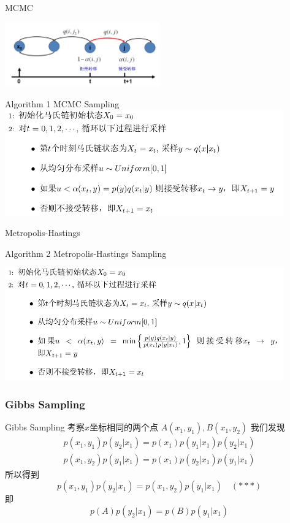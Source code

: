 \documentclass{beamer}
\begin{document}
\begin{CJK*}{UTF8}{gbsn}
\begin{frame}{MCMC}
\begin{center}
      \includegraphics[width=0.5\textwidth]{picture/MCMCp.png}
	\begin{block}{Algorithm 1 MCMC Sampling}
	\includegraphics[width=0.9\textwidth]{picture/MCMC.png}
	\end{block}
\end{center}
\end{frame}


\begin{frame}{Metropolis-Hastings}
\begin{center}
	\begin{block}{Algorithm 2 Metropolis-Hastings Sampling}
	\begin{center}
      \includegraphics[width=0.9\textwidth]{picture/MH.png}
    \end{center} 
	\end{block}
\end{center}
\end{frame}

\subsubsection{Gibbs Sampling}
\begin{frame}{Gibbs Sampling}
考察$x$坐标相同的两个点
$A(x_1,y_1), B(x_1,y_2)$
我们发现
\begin{align*}
p(x_1,y_1)p(y_2|x_1) = p(x_1)p(y_1|x_1)p(y_2|x_1) \\
p(x_1,y_2)p(y_1|x_1) = p(x_1)p(y_2|x_1)p(y_1|x_1)
\end{align*}
所以得到
\begin{equation}
\label{gibbs-detailed-balance}
p(x_1,y_1)p(y_2|x_1) = p(x_1,y_2)p(y_1|x_1)  \quad (***)
\end{equation}
即$$ p(A)p(y_2|x_1) = p(B)p(y_1|x_1) $$
\end{frame}


\end{CJK*}
\end{document}
